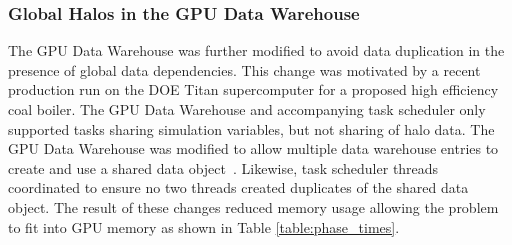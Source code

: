 \documentclass[12pt]{article}
\begin{document}
\subsubsection{Global Halos in the GPU Data Warehouse}
\label{ch:global_halos_gpu_data_warehouse}
The GPU Data Warehouse was further modified to avoid data duplication in the presence of global data dependencies.  This change was motivated by a recent production run on the DOE Titan supercomputer for a proposed high efficiency coal boiler.  The GPU Data Warehouse and accompanying task scheduler only supported tasks sharing simulation variables, but not sharing of halo data.  The GPU Data Warehouse was modified to allow multiple data warehouse entries to create and use a shared data object~\cite{espm2-brad}.  Likewise, task scheduler threads coordinated to ensure no two threads created duplicates of the shared data object.  The result of these changes reduced memory usage allowing the problem to fit into GPU memory as shown in Table \ref{table:phase_times}.  
\end{document}
